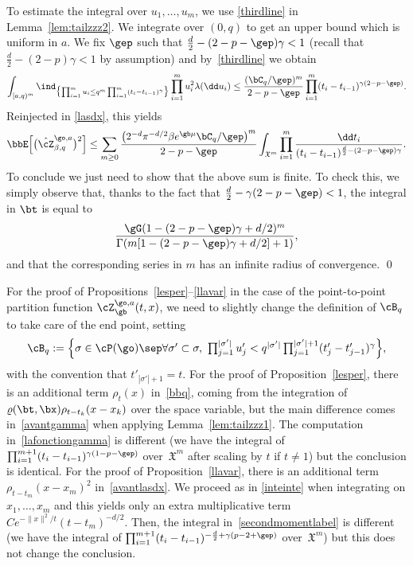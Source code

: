 To estimate the integral over $u_1, \ldots, u_m$, we use \eqref{thirdline} in Lemma~\ref{lem:tailzzz2}. We integrate over $(0,q)$ to get an upper bound which is uniform in $a$.
We fix $\gep$ such that $\frac d2- (2-p-\gep)\gamma<1$ (recall that $\frac d2- (2-p)\gamma<1$ by assumption) and by~\eqref{thirdline} we obtain
\[
\int_{[a,q)^m} \ind_{\bigl\{\prod_{i=1}^m u_i\le q^m \prod_{i=1}^m (t_i-t_{i-1})^{\gamma}\bigr\}}\prod_{i=1}^m u^2_i \lambda(\dd u_i)
\le \frac{ (\bC_q/\gep)^m }{2- p-\gep} \prod_{i=1}^m (t_i-t_{i-1})^{ \gamma (2-p-\gep) }.
\]
Reinjected in \eqref{lasdx}, this yields\vspace*{-3pt}
\begin{equation}
\label{secondmomentlabel}
\bbE \Bigl[ \bigl(\hat \cZ^{\go,a}_{\beta,q} \bigr)^2 \Bigr]
\le \sum_{m \ge 0} \frac{ \bigl(2^{-d} \pi^{-d/2} \beta e^{\gb\mu} \bC_q/\gep\bigr)^m }{2-p-\gep} \int_{\mathfrak{X}^m} \prod_{i=1}^m
\frac{\dd t_i}{(t_i-t_{i-1})^{ \frac d2- (2-p- \gep)\gamma} }.
\end{equation}
To conclude we just need to show that the above sum is finite.
To check this, we simply observe that, thanks to the fact that $\frac{d}{2} - \gamma(2-p -\gep) <1$, the integral in $\bt$ is equal to\vspace*{-3pt}
\[
\frac{\gG(1- (2-p-\gep)\gamma+d/2)^m}{\Gamma(m[1- (2-p-\gep) \gamma+d/2]+1)},
\]
and that the corresponding series in $m$ has an infinite radius of convergence.
\qed

\begin{rem}
For the proof of Propositions~\ref{lesper}--\ref{llavar}
in the case of the point-to-point partition function $\cZ_{\gb}^{\go,a} (t,x)$,
we need to slightly change the definition
of $\cB_q$ to take care of the end point, setting\vspace*{-3pt}
\[\textstyle
\cB_q:=\Bigl\{ \sigma \in \cP(\go) \sep
\forall \sigma'\subset \sigma, \ \prod_{j=1}^{|\sigma'|} u'_j < q^{|\sigma'|}\prod_{j=1}^{|\sigma'|+1} (t'_j-t'_{j-1})^{\gamma} \Bigr\},
\]
with the convention that $t'_{|\sigma'|+1} =t$.
For the proof of Proposition~\ref{lesper},
there is an additional term $\rho_t(x)$
in~\eqref{bbq}, coming from the integration of
$\varrho(\bt,\bx) \rho_{t-t_k}(x-x_k)$ over the space variable, but the main
difference comes in~\eqref{avantgamma} when applying Lemma~\ref{lem:tailzzz1}.
The computation in~\eqref{lafonctiongamma} is different
(we have the integral of $\prod_{i=1}^{m+1} (t_i-t_{i-1})^{\gamma(1-p-\gep)}$ over~$\mathfrak{X}^m$
after scaling by $t$ if $t\neq 1$)
but the conclusion is identical.
For the proof of Proposition~\ref{llavar},
there is an additional term $\rho_{t-t_m}(x-x_m)^2$
in~\eqref{avantlasdx}. We proceed as in \eqref{inteinte} when integrating on $x_1,\dots,x_m$
and this yields only an extra multiplicative term $C e^{- \|x\|^2/t} (t-t_m)^{-d/2}$.
Then, the integral in~\eqref{secondmomentlabel}
is different
(we have the integral of $\prod_{i=1}^{m+1} (t_i-t_{i-1})^{ -\frac d2 +\gamma(p-2+\gep)}$ over~$\mathfrak{X}^m$) but
this does not change the conclusion.
\end{rem}

